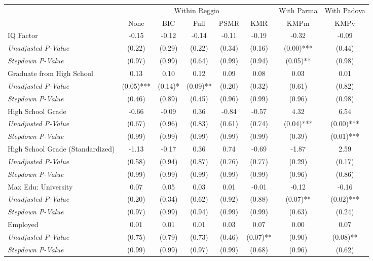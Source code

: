 \begin{tabular}{l c c c c c c c}
\toprule
& \multicolumn{5}{c}{Within Reggio} & With Parma & With Padova \\\cmidrule(lr){2-6} \cmidrule(lr){7-7} \cmidrule(lr){8-8}
 & None & BIC & Full & PSMR & KMR & KMPm & KMPv \\
\midrule
IQ Factor & -0.15 & -0.12 & -0.14 & -0.11 & -0.19 & -0.32 & -0.09 \\
\quad \textit{Unadjusted P-Value} & (0.22) & (0.29) & (0.22) & (0.34) & (0.16) & (0.00)*** & (0.44) \\
\quad \textit{Stepdown P-Value} & (0.97) & (0.99) & (0.64) & (0.99) & (0.94) & (0.05)** & (0.98) \\
Graduate from High School & 0.13 & 0.10 & 0.12 & 0.09 & 0.08 & 0.03 & 0.01 \\
\quad \textit{Unadjusted P-Value} & (0.05)*** & (0.14)* & (0.09)** & (0.20) & (0.32) & (0.61) & (0.82) \\
\quad \textit{Stepdown P-Value} & (0.46) & (0.89) & (0.45) & (0.96) & (0.99) & (0.96) & (0.98) \\
High School Grade & -0.66 & -0.09 & 0.36 & -0.84 & -0.57 & 4.32 & 6.54 \\
\quad \textit{Unadjusted P-Value} & (0.67) & (0.96) & (0.83) & (0.61) & (0.74) & (0.04)*** & (0.00)*** \\
\quad \textit{Stepdown P-Value} & (0.99) & (0.99) & (0.99) & (0.99) & (0.99) & (0.39) & (0.01)*** \\
High School Grade (Standardized) & -1.13 & -0.17 & 0.36 & 0.74 & -0.69 & -1.87 & 2.59 \\
\quad \textit{Unadjusted P-Value} & (0.58) & (0.94) & (0.87) & (0.76) & (0.77) & (0.29) & (0.17) \\
\quad \textit{Stepdown P-Value} & (0.99) & (0.99) & (0.99) & (0.99) & (0.99) & (0.96) & (0.86) \\
Max Edu: University & 0.07 & 0.05 & 0.03 & 0.01 & -0.01 & -0.12 & -0.16 \\
\quad \textit{Unadjusted P-Value} & (0.20) & (0.34) & (0.62) & (0.92) & (0.88) & (0.07)** & (0.02)*** \\
\quad \textit{Stepdown P-Value} & (0.97) & (0.99) & (0.94) & (0.99) & (0.99) & (0.63) & (0.24) \\
Employed & 0.01 & 0.01 & 0.01 & 0.03 & 0.07 & 0.00 & 0.07 \\
\quad \textit{Unadjusted P-Value} & (0.75) & (0.79) & (0.73) & (0.46) & (0.07)** & (0.90) & (0.08)** \\
\quad \textit{Stepdown P-Value} & (0.99) & (0.99) & (0.97) & (0.99) & (0.68) & (0.96) & (0.62) \\

\end{tabular}
